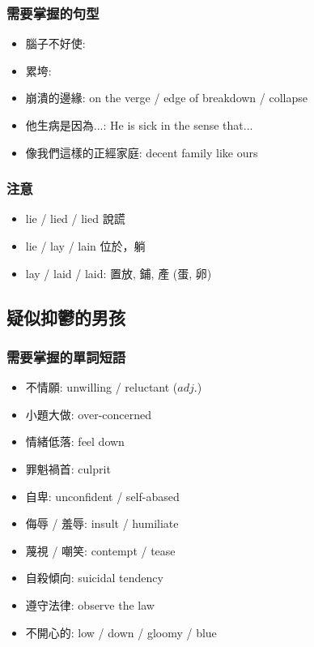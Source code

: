 \subsubsection*{需要掌握的句型}
\begin{itemize}
  \itemsep0em
  \item 腦子不好使: 
  \item 累垮: 
  \item 崩潰的邊緣: on the verge / edge of breakdown / collapse
  \item 他生病是因為...: He is sick in the sense that...
  \item 像我們這樣的正經家庭: decent family like ours
\end{itemize}

\subsubsection*{注意}
\begin{multicols}{2}
\begin{itemize}
  \itemsep0em
  \item lie / lied / lied 說謊
  \item lie / lay / lain 位於，躺
  \item lay / laid / laid: 置放, 鋪, 產 (蛋, 卵)
\end{itemize}
\end{multicols}

\subsection{疑似抑鬱的男孩}
\subsubsection*{需要掌握的單詞短語}
\begin{multicols}{2}
\begin{itemize}
  \itemsep0em
  \item 不情願: unwilling / reluctant ($adj.$)
  \item 小題大做: over-concerned
  \item 情緒低落: feel down
  \item 罪魁禍首: culprit
  \item 自卑: unconfident / self-abased
  \item 侮辱 / 羞辱: insult / humiliate
  \item 蔑視 / 嘲笑: contempt / tease
  \item 自殺傾向: suicidal tendency
  \item 遵守法律: observe the law
  \item 不開心的: low / down / gloomy / blue
\end{itemize}
\end{multicols}

